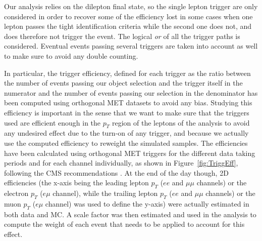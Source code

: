 \documentclass[a4paper, 10pt, openright]{report}
\begin{document}
Our analysis relies on the dilepton final state, so the single lepton trigger are only considered in order to recover some of the efficiency lost in some cases when one lepton passes the tight identification criteria while the second one does not, and does therefore not trigger the event. The logical \textit{or} of all the trigger paths is considered. Eventual events passing several triggers are taken into account as well to make sure to avoid any double counting.

In particular, the trigger efficiency, defined for each trigger as the ratio between the number of events passing our object selection and the trigger itself in the numerator and the number of events passing our selection in the denominator has been computed using orthogonal \ac{MET} datasets to avoid any bias. Studying this efficiency is important in the sense that we want to make sure that the triggers used are efficient enough in the $p_T$ region of the leptons of the analysis to avoid any undesired effect due to the turn-on of any trigger, and because we actually use the computed efficiency to reweight the simulated samples. The efficiencies have been calculated using orthogonal \ac{MET} triggers for the different data taking periods and for each channel individually, as shown in Figure~\ref{fig:TriggEff}, following the \ac{CMS} recommendations \cite{triggerEff}. At the end of the day though, 2D efficiencies (the x-axis being the leading lepton $p_T$ ($ee$ and $\mu \mu$ channels) or the electron $p_T$ ($e \mu$ channel), while the trailing lepton $p_T$ ($ee$ and $\mu \mu$ channels) or the muon $p_T$ ($e \mu$ channel) was used to define the y-axis) were actually estimated in both data and \ac{MC}. A scale factor was then estimated and used in the analysis to compute the weight of each event that needs to be applied to account for this effect.
\end{document}
